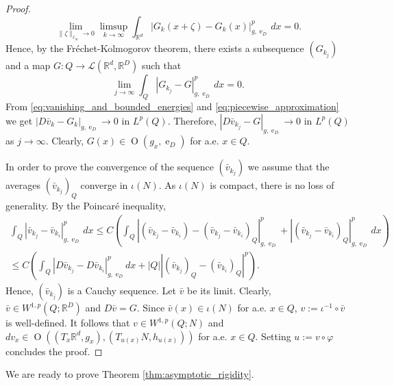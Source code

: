 \documentclass{article}
\numberwithin{equation}{section}
\theoremstyle{definition}
\theoremstyle{remark}
\DeclareMathOperator{\e}{e}
\DeclareMathOperator{\Ort}{O}
\begin{document}
\begin{proof}
    \[
    \lim_{\|\zeta\|_{\ell_\infty} \to 0} \limsup_{k \to \infty} \int_{\mathbb{R}^d} |G_k(x + \zeta) - G_k(x)|_{g, \e_D}^p \, dx = 0.
    \]
    Hence, by the Fréchet-Kolmogorov theorem, there exists a subsequence $(G_{k_j})$ and a map $G : Q \rightarrow \mathcal{L}(\mathbb{R}^d, \mathbb{R}^D)$ such that
    \[
    \lim_{j \to \infty} \int_{Q} |G_{k_j} - G|_{g, \e_D}^p \, dx = 0.
    \]
    From \eqref{eq:vanishing_and_bounded_energies} and \eqref{eq:piecewise_approximation} we get $|D\bar{v}_k - G_k|_{g, \e_D} \to 0$ in $L^p(Q)$. Therefore, $|D\bar{v}_{k_j} - G|_{g, \e_D} \to 0$ in $L^p(Q)$ as $j \to \infty$. Clearly, $G(x) \in \Ort(g_x, \e_D)$ for a.e. $x \in Q$.
    
    In order to prove the convergence of the sequence $(\bar{v}_{k_j})$ we assume that the averages $(\bar{v}_{k_j})_Q$ converge in $\iota(N)$. As $\iota(N)$ is compact, there is no loss of generality. By the Poincaré inequality,
    \begin{multline*}
        \int_{Q} |\bar{v}_{k_j} - \bar{v}_{k_i}|_{g, \e_D}^p \, dx \le C\left(\int_Q |(\bar{v}_{k_j} - \bar{v}_{k_i}) - (\bar{v}_{k_j} - \bar{v}_{k_i})_Q|_{g, \e_D}^p + |(\bar{v}_{k_j} - \bar{v}_{k_i})_Q|_{g, \e_D}^p \, dx\right) \\
        \le C \left(\int_Q |D\bar{v}_{k_j} - D\bar{v}_{k_i}|_{g, \e_D}^p dx + |Q||(\bar{v}_{k_j})_Q - (\bar{v}_{k_i})_Q|^p\right).
    \end{multline*}
    Hence, $(\bar{v}_{k_j})$ is a Cauchy sequence. Let $\bar{v}$ be its limit. Clearly, $\bar{v} \in W^{1, p}(Q; \mathbb{R}^D)$ and $D\bar{v} = G$. Since $\bar{v}(x) \in \iota(N)$ for a.e. $x \in Q$, $v := \iota^{-1} \circ \bar{v}$ is well-defined. It follows that $v \in W^{1, p}(Q; N)$ and $dv_x \in \Ort((T_x\mathbb{R}^d, g_x), (T_{u(x)}N, h_{u(x)}))$ for a.e. $x \in Q$. Setting $u := v \circ \varphi$ concludes the proof.
\end{proof}

We are ready to prove Theorem \ref{thm:asymptotic_rigidity}.
\end{document}
